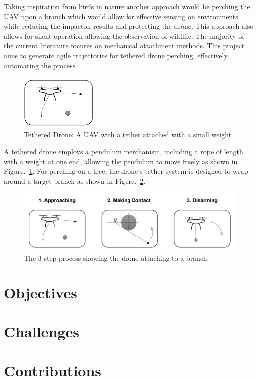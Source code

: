 Taking inspiration from birds in nature another approach would be perching the UAV upon a branch which would allow for effective sensing on environments while reducing the impacton results and protecting the drone.
This approach also allows for silent operation allowing the observation of wildlife.
The majority of the current literature focuses on mechanical attachment methods.
This project aims to generate agile trajectories for tethered drone perching, effectively automating the process.


\begin{figure}[htbp]
  \centering
  \includegraphics[width=0.33\textwidth]{introduction/tetheredDroneImage.png}
  \caption{Tethered Drone: A UAV with a tether attached with a small weight}
\label{fig:intro-tethered-drone}
\end{figure}

A tethered drone employs a pendulum merchanism, including a rope of length with a weight at one end, allowing the pendulum to move freely as shown in Figure.~\ref*{fig:intro-tethered-drone}.
For perching on a tree, the drone's tether system is designed to wrap around a target branch as shown in Figure.~\ref{fig:intro-wrapping}.

\begin{figure}[htbp]
  \centering
  \includegraphics[width=\textwidth]{introduction/dronePerching.png}
  \caption{The 3 step process showing the drone attaching to a branch.}
\label{fig:intro-wrapping}
\end{figure}

\section{Objectives}
\section{Challenges}
\section{Contributions}